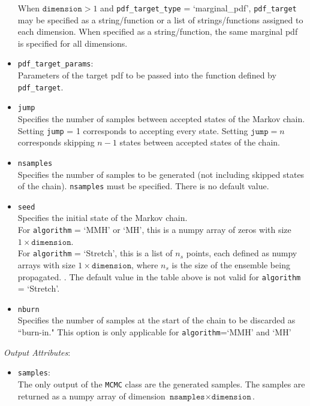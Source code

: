 \documentclass[./UsersGuide.tex]{subfiles}
\begin{document}
\begin{itemize}
	When $\texttt{dimension}>1$ and \texttt{pdf\_target\_type} = `marginal\_pdf', \texttt{pdf\_target} may be specified as a string/function or a list of strings/functions assigned to each 		dimension. When specified as a string/function, the same marginal pdf is specified for all dimensions.
\item \texttt{pdf\_target\_params}:\\
	Parameters of the target pdf to be passed into the function defined by \texttt{pdf\_target}.
\item \texttt{jump}\\
	Specifies the number of samples between accepted states of the Markov chain. Setting \texttt{jump} = 1 corresponds to accepting every state. Setting $\texttt{jump} = n$ corresponds 	skipping $n-1$ states between accepted states of the chain.
\item \texttt{nsamples}\\
	Specifies the number of samples to be generated (not including skipped states of the chain). \texttt{nsamples} must be specified. There is no default value.
\item \texttt{seed}\\
	Specifies the initial state of the Markov chain. \\
	
	For \texttt{algorithm} = `MMH' or `MH', this is a numpy array of zeros with size $1\times \texttt{dimension}$.\\
	
	For \texttt{algorithm} = `Stretch', this is a list of $n_s$ points, each defined as numpy arrays with size $1\times \texttt{dimension}$, where $n_s$ is the size of the ensemble being 		propagated. \cite{Goodman2010}. The default value in the table above is not valid for  \texttt{algorithm} = `Stretch'.
\item \texttt{nburn}\\
	Specifies the number of samples at the start of the chain to be discarded as ``burn-in." This option is only applicable for \texttt{algorithm}=`MMH' and `MH'
\end{itemize}

\noindent\textit{Output Attributes}:
\begin{itemize}
\item \texttt{samples}:\\
	The only output of the \texttt{MCMC} class are the generated samples. The samples are returned as a numpy array of dimension $\texttt{nsamples}\times\texttt{dimension}$. 
\end{itemize}
\end{document}
